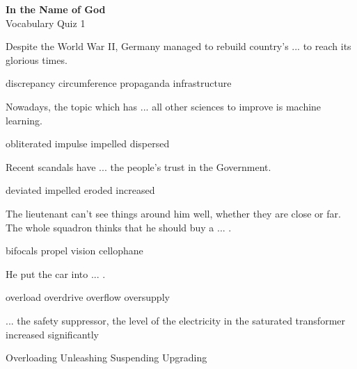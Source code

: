 \documentclass{exam}
\begin{document}
\begin{center}
\textbf{In the Name of God}\\ 
Vocabulary Quiz 1
\end{center}
\vspace{5mm}
\begin{questions}


\question Despite the World War II, Germany managed to rebuild country's ... to reach its glorious times.\\
\begin{oneparchoices}
 \choice discrepancy
 \choice circumference
 \choice propaganda
 \correctchoice infrastructure
\end{oneparchoices}



\question Nowadays, the topic which has ... all other sciences to improve is machine learning.\\
\begin{oneparchoices}
 
 \choice obliterated
 \choice impulse
\correctchoice impelled
 \choice dispersed
\end{oneparchoices}


\question Recent scandals have ... the people's trust in the Government.\\
\begin{oneparchoices}
 \choice deviated
 \choice impelled
 \correctchoice  eroded
 \choice increased
\end{oneparchoices}


\question The lieutenant can't see things around him well, whether they are close or far. The whole squadron thinks that he should buy a ... .\\
\begin{oneparchoices}
 \correctchoice bifocals
 \choice propel
 \choice vision
 \choice cellophane
\end{oneparchoices}
\question He put the car into ... .\\
\begin{oneparchoices}
\choice overload
\correctchoice overdrive
\choice overflow
\choice oversupply
\end{oneparchoices}


\question ... the safety suppressor, the level of the electricity in the saturated transformer increased significantly\\
\begin{oneparchoices}
\choice Overloading
 \correctchoice Unleashing
 \choice Suspending
 \choice Upgrading
\end{oneparchoices}



\end{questions}
\end{document}
